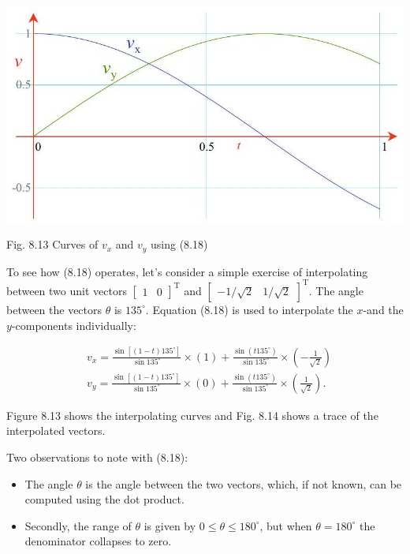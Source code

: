\documentclass[10pt]{article}
\begin{document}
\begin{center}
\includegraphics[max width=\textwidth]{2023_04_20_41f1ceac5a31dc7d1b59g-166}
\end{center}

Fig. 8.13 Curves of $v_{x}$ and $v_{y}$ using (8.18)

To see how (8.18) operates, let's consider a simple exercise of interpolating between two unit vectors $\left[\begin{array}{ll}1 & 0\end{array}\right]^{\mathrm{T}}$ and $\left[\begin{array}{ll}-1 / \sqrt{2} & 1 / \sqrt{2}\end{array}\right]^{\mathrm{T}}$. The angle between the vectors $\theta$ is $135^{\circ}$. Equation (8.18) is used to interpolate the $x$-and the $y$-components individually:

$$
\begin{aligned}
& v_{x}=\frac{\sin \left[(1-t) 135^{\circ}\right]}{\sin 135^{\circ}} \times(1)+\frac{\sin \left(t 135^{\circ}\right)}{\sin 135^{\circ}} \times\left(-\frac{1}{\sqrt{2}}\right) \\
& v_{y}=\frac{\sin \left[(1-t) 135^{\circ}\right]}{\sin 135^{\circ}} \times(0)+\frac{\sin \left(t 135^{\circ}\right)}{\sin 135^{\circ}} \times\left(\frac{1}{\sqrt{2}}\right) .
\end{aligned}
$$

Figure 8.13 shows the interpolating curves and Fig. 8.14 shows a trace of the interpolated vectors.

Two observations to note with (8.18):

\begin{itemize}
  \item The angle $\theta$ is the angle between the two vectors, which, if not known, can be computed using the dot product.

  \item Secondly, the range of $\theta$ is given by $0 \leq \theta \leq 180^{\circ}$, but when $\theta=180^{\circ}$ the denominator collapses to zero.

\end{itemize}
\end{document}

